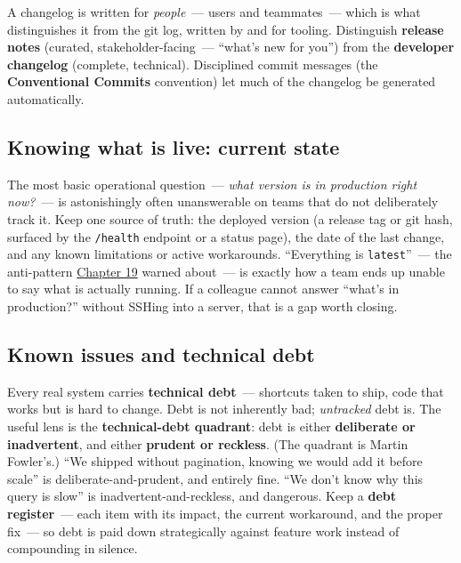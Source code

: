 \noindent{}A changelog is written for \emph{people}~--- users and teammates~--- which is what distinguishes it from the git log, written by and for tooling. Distinguish \textbf{release notes} (curated, stakeholder-facing~--- ``what's new for you'') from the \textbf{developer changelog} (complete, technical). Disciplined commit messages (the \textbf{Conventional Commits} convention) let much of the changelog be generated automatically.

\subsection*{Knowing what is live: current state}\label{39-local-vs-production:knowing-what-is-live-current-state}

The most basic operational question~--- \emph{what version is in production right now?}~--- is astonishingly often unanswerable on teams that do not deliberately track it. Keep one source of truth: the deployed version (a release tag or git hash, surfaced by the \texttt{/health} endpoint or a status page), the date of the last change, and any known limitations or active workarounds. ``Everything is \texttt{latest}''~--- the anti-pattern \hyperref[ch:19-artifact-storage]{Chapter 19} warned about~--- is exactly how a team ends up unable to say what is actually running. If a colleague cannot answer ``what's in production?'' without SSHing into a server, that is a gap worth closing.

\subsection*{Known issues and technical debt}\label{39-local-vs-production:known-issues-and-technical-debt}

Every real system carries \textbf{technical debt}~--- shortcuts taken to ship, code that works but is hard to change. Debt is not inherently bad; \emph{untracked} debt is. The useful lens is the \textbf{technical-debt quadrant}: debt is either \textbf{deliberate or inadvertent}, and either \textbf{prudent or reckless}. (The quadrant is Martin Fowler's.) ``We shipped without pagination, knowing we would add it before scale'' is deliberate-and-prudent, and entirely fine. ``We don't know why this query is slow'' is inadvertent-and-reckless, and dangerous. Keep a \textbf{debt register}~--- each item with its impact, the current workaround, and the proper fix~--- so debt is paid down strategically against feature work instead of compounding in silence.

